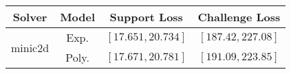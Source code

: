 \begin{tabular}{cc|c|c} 
\hline 
 Solver & Model & Support Loss  & Challenge Loss \tabularnewline\hline 
\hline 
\multirow{2}{*}{minic2d} & Exp. & $\left[17.651,20.734\right]$ & $\left[187.42,227.08\right]$ \tabularnewline 
 & Poly. & $\left[17.671,20.781\right]$ & $\left[191.09,223.85\right]$ \tabularnewline 
\hline 
\end{tabular} 

